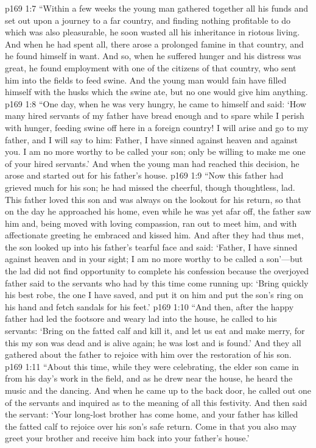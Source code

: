 \vs p169 1:7 \textcolor{ubdarkred}{“Within a few weeks the young man gathered together all his funds and set out upon a journey to a far country, and finding nothing profitable to do which was also pleasurable, he soon wasted all his inheritance in riotous living. And when he had spent all, there arose a prolonged famine in that country, and he found himself in want. And so, when he suffered hunger and his distress was great, he found employment with one of the citizens of that country, who sent him into the fields to feed swine. And the young man would fain have filled himself with the husks which the swine ate, but no one would give him anything.}
\vs p169 1:8 \textcolor{ubdarkred}{“One day, when he was very hungry, he came to himself and said: ‘How many hired servants of my father have bread enough and to spare while I perish with hunger, feeding swine off here in a foreign country! I will arise and go to my father, and I will say to him: Father, I have sinned against heaven and against you. I am no more worthy to be called your son; only be willing to make me one of your hired servants.’ And when the young man had reached this decision, he arose and started out for his father’s house.}
\vs p169 1:9 \textcolor{ubdarkred}{“Now this father had grieved much for his son; he had missed the cheerful, though thoughtless, lad. This father loved this son and was always on the lookout for his return, so that on the day he approached his home, even while he was yet afar off, the father saw him and, being moved with loving compassion, ran out to meet him, and with affectionate greeting he embraced and kissed him. And after they had thus met, the son looked up into his father’s tearful face and said: ‘Father, I have sinned against heaven and in your sight; I am no more worthy to be called a son’---but the lad did not find opportunity to complete his confession because the overjoyed father said to the servants who had by this time come running up: ‘Bring quickly his best robe, the one I have saved, and put it on him and put the son’s ring on his hand and fetch sandals for his feet.’}
\vs p169 1:10 \textcolor{ubdarkred}{“And then, after the happy father had led the footsore and weary lad into the house, he called to his servants: ‘Bring on the fatted calf and kill it, and let us eat and make merry, for this my son was dead and is alive again; he was lost and is found.’ And they all gathered about the father to rejoice with him over the restoration of his son.}
\vs p169 1:11 \textcolor{ubdarkred}{“About this time, while they were celebrating, the elder son came in from his day’s work in the field, and as he drew near the house, he heard the music and the dancing. And when he came up to the back door, he called out one of the servants and inquired as to the meaning of all this festivity. And then said the servant: ‘Your long\hyp{}lost brother has come home, and your father has killed the fatted calf to rejoice over his son’s safe return. Come in that you also may greet your brother and receive him back into your father’s house.’}
